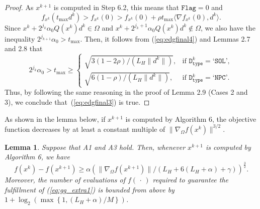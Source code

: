 \documentclass[11pt]{article}
\newtheorem{lemma}[theorem]{Lemma}
\begin{document}
\begin{proof}
As $x^{k+1}$ is computed in Step 6.2, this means that $\texttt{Flag}=0$ and 
\begin{equation}
f_{x^{k}}(t_{\max}d^{k})>f_{x^{k}}(0)>f_{x^{k}}(0)+\rho t_{\max}\langle\nabla f_{x^{k}}(0),d^{k}\rangle.
\label{eq:edgfinal4}
\end{equation}
Since $x^{k}+2^{j_{k}}\alpha_{0}Q(x^{k})d^{k}\in\Omega$ and $x^{k}+2^{j_{k}+1}\alpha_{0}Q(x^{k})d^{k}\notin\Omega$\normalsize, we also have the inequality $2^{j_{k+1}}\alpha_{0}>t_{\max}$. Then, it follows from (\ref{eq:edgfinal4}) and Lemmas 2.7 and 2.8 that 
\small
\[
2^{j_{k}}\alpha_{0} > t_{\max} \geq
\left\{
\begin{array}{ll} 
\sqrt{3(1-2\rho)/(L_{H}\|d^{k}\|)}, 
& \text{if } \texttt{D}_{\texttt{type}}^{k}=\texttt{`SOL'},\\
\sqrt{6(1-\rho)/(L_{H}\|d^{k}\|)}, 
& \text{if } \texttt{D}_{\texttt{type}}^{k}=\texttt{`NPC'}.
\end{array}
\right.
\]
\normalsize
Thus, by following the same reasoning in the proof of Lemma 2.9 (Cases 2 and 3), we conclude that~(\ref{eq:edgfinal3}) is true.
\end{proof}

As shown in the lemma below, if $x^{k+1}$ is computed by Algorithm 6, the objective function decreases by at least a constant multiple of $\|\nabla_{\Omega}f(x^{k})\|^{3/2}$.

\begin{lemma} Suppose that A1 and A3 hold. Then, whenever $x^{k+1}$ is computed by Algorithm 6, we have
\small
\begin{equation}
f(x^{k})-f(x^{k+1}) \geq \alpha \left( \|\nabla_{\Omega}f(x^{k+1})\| / \left(L_{H}+6(L_{H}+\alpha)+\gamma\right) \right)^{\frac{3}{2}}.
    \label{eq:gg_extra2}
\end{equation}
\normalsize
Moreover, the number of evaluations of $f(\,\cdot\,)$ required to guarantee the fulfillment of (\ref{eq:gg_extra1}) is bounded from above by $1+\log_{2}\left(\max\left\{1,(L_{H}+\alpha)/M\right\}\right)$.
    \label{lem:2.4}
\end{lemma}
\end{document}
